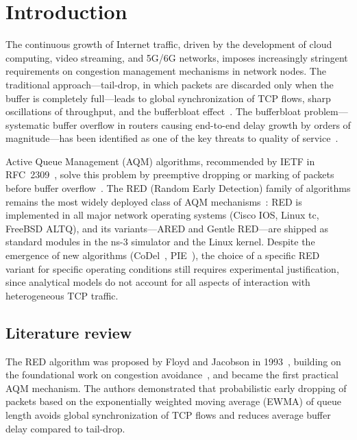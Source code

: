\documentclass[default]{subfiles}
\begin{document}
{\maketitle

\section{Introduction}
\label{sec:intro}

The continuous growth of Internet traffic, driven by the development of cloud computing, video streaming, and 5G/6G networks, imposes increasingly stringent requirements on congestion management mechanisms in network nodes. The traditional approach---tail-drop, in which packets are discarded only when the buffer is completely full---leads to global synchronization of TCP flows, sharp oscillations of throughput, and the bufferbloat effect~\cite{gettys2012}. The bufferbloat problem---systematic buffer overflow in routers causing end-to-end delay growth by orders of magnitude---has been identified as one of the key threats to quality of service~\cite{rfc8289}.

Active Queue Management (AQM) algorithms, recommended by IETF in RFC~2309~\cite{rfc2309}, solve this problem by preemptive dropping or marking of packets before buffer overflow~\cite{adams2012}. The RED (Random Early Detection) family of algorithms remains the most widely deployed class of AQM mechanisms~\cite{kulyabov2018}: RED is implemented in all major network operating systems (Cisco IOS, Linux tc, FreeBSD ALTQ), and its variants---ARED and Gentle RED---are shipped as standard modules in the ns-3 simulator and the Linux kernel. Despite the emergence of new algorithms (CoDel~\cite{nichols2012}, PIE~\cite{pan2013}), the choice of a specific RED variant for specific operating conditions still requires experimental justification, since analytical models do not account for all aspects of interaction with heterogeneous TCP traffic.

\subsection{Literature review}

The RED algorithm was proposed by Floyd and Jacobson in 1993~\cite{floyd1993}, building on the foundational work on congestion avoidance~\cite{jacobson1988}, and became the first practical AQM mechanism. The authors demonstrated that probabilistic early dropping of packets based on the exponentially weighted moving average (EWMA) of queue length avoids global synchronization of TCP flows and reduces average buffer delay compared to tail-drop.

}
\end{document}
